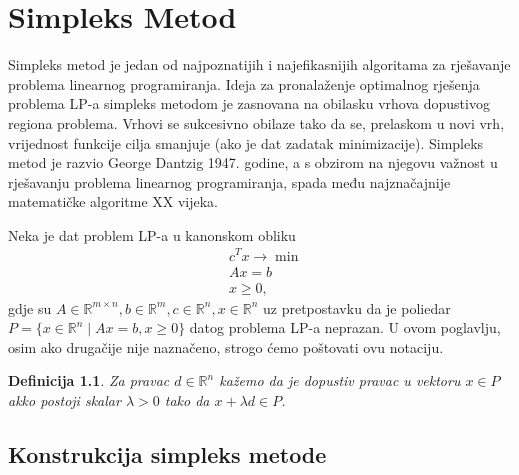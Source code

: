 \documentclass[a4paper, utf8, 11pt, colorlinks]{book}
\newtheorem{definition}{Definicija}[chapter]
\theoremstyle{definition}
\begin{document}
\newpage 
\chapter{Simpleks Metod}\label{chp:simpleks}

Simpleks metod je jedan od najpoznatijih i najefikasnijih algoritama za rješavanje problema linearnog programiranja. Ideja za pronalaženje optimalnog rješenja problema LP-a simpleks metodom je zasnovana na  obilasku vrhova dopustivog regiona problema. Vrhovi se sukcesivno obilaze tako da se, prelaskom u novi vrh, vrijednost funkcije cilja smanjuje (ako je dat zadatak minimizacije). Simpleks metod je razvio George Dantzig 1947. godine, a s obzirom na njegovu važnost u rješavanju problema linearnog programiranja, spada među najznačajnije matematičke algoritme XX vijeka.

Neka je dat problem LP-a u kanonskom obliku
\begin{align}
    &c^Tx \rightarrow \min \nonumber \\ 
    & A x = b \nonumber \\
    & x \geq 0, \label{eq:lp_equality_constraint}
\end{align}
gdje su $A \in \mathbb{R}^{m \times n}, b \in \mathbb{R}^m, c \in \mathbb{R}^n, x\in \mathbb{R}^n$ uz pretpostavku da je poliedar $P=\{ x \in \mathbb{R}^n \mid A x = b , x \geq 0 \}$ datog problema LP-a neprazan.  U ovom poglavlju, osim ako drugačije nije naznačeno, strogo ćemo poštovati ovu notaciju. 


\begin{definition}
      Za pravac $d\in \mathbb{R}^n$ kažemo da je dopustiv pravac u vektoru $x \in P$ akko postoji skalar $\lambda > 0$ tako da $x + \lambda d \in P$.
\end{definition}

\section{Konstrukcija simpleks metode}
\end{document}
